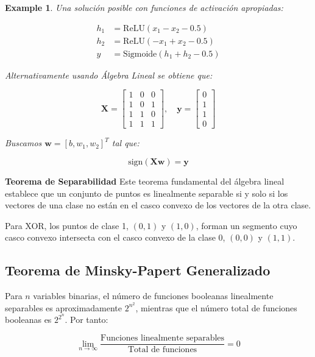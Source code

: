 \documentclass[12pt]{article}
\newtheorem {example}{Example}
\begin{document}
\begin{example} Una solución posible con funciones de activación apropiadas:

\begin{align}
h_1 &= \text{ReLU}(x_1 - x_2 - 0.5) \\
h_2 &= \text{ReLU}(-x_1 + x_2 - 0.5) \\
y &= \text{Sigmoide}(h_1 + h_2 - 0.5)
\end{align}

Alternativamente usando Álgebra Lineal se obtiene que:


\begin{equation}
\mathbf{X} = \begin{bmatrix}
1 & 0 & 0 \\
1 & 0 & 1 \\
1 & 1 & 0 \\
1 & 1 & 1
\end{bmatrix}, \quad 
\mathbf{y} = \begin{bmatrix}
0 \\ 1 \\ 1 \\ 0
\end{bmatrix}
\end{equation}

Buscamos $\mathbf{w} = [b, w_1, w_2]^T$ tal que:

\begin{equation}
\text{sign}(\mathbf{X}\mathbf{w}) = \mathbf{y}
\end{equation}
\end{example}
\textbf{Teorema de Separabilidad} Este teorema fundamental del álgebra lineal establece que un conjunto de puntos es linealmente separable si y solo si los vectores de una clase no están en el casco convexo de los vectores de la otra clase.

Para XOR, los puntos de clase 1, $(0,1)$ y $(1,0)$, forman un segmento cuyo casco convexo intersecta con el casco convexo de la clase 0, $(0,0)$ y $(1,1)$.


\subsection{Teorema de Minsky-Papert Generalizado}

Para $n$ variables binarias, el número de funciones booleanas linealmente separables es aproximadamente $2^{n^2}$, mientras que el número total de funciones booleanas es $2^{2^n}$. Por tanto:

\begin{equation}
\lim_{n \to \infty} \frac{\text{Funciones linealmente separables}}{\text{Total de funciones}} = 0
\end{equation}
\end{document}
